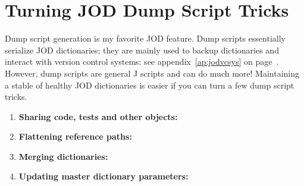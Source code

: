 \section{Turning JOD Dump Script Tricks}\label{ap:joddumptricks}

Dump script generation is my favorite JOD feature. Dump scripts essentially serialize 
JOD dictionaries; they are mainly used to backup dictionaries and interact with 
version control systems: see appendix~\ref{ap:jodvcsys} on page~\pageref{ap:jodvcsys}.
However, dump scripts are general J scripts and can do much more!  
Maintaining a stable of healthy JOD dictionaries is easier 
if you can turn a few dump script tricks.

\begin{enumerate}
\item \textbf{Sharing code, tests and other objects:}
\item \textbf{Flattening reference paths:}
\item \textbf{Merging dictionaries:}
\item \textbf{Updating master dictionary parameters:}
\end{enumerate} 

